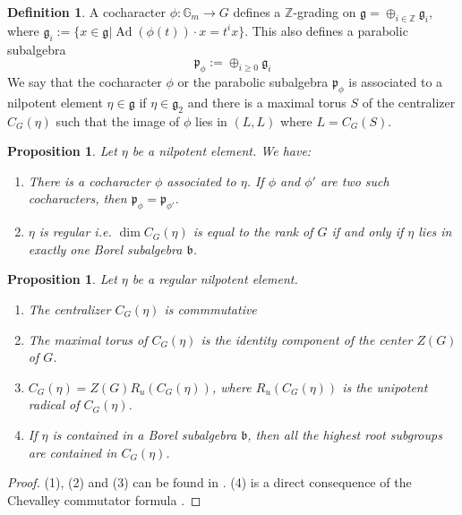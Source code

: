 \documentclass[11pt]{amsart}
\newtheorem{prop}[thm]{Proposition}
\theoremstyle{definition}
\newtheorem{defn}[thm]{Definition}
\theoremstyle{remark}
\DeclareMathOperator{\Ad}{Ad}
\numberwithin{equation}{section}
\begin{document}
\begin{defn} 
    A cocharacter $\phi: \mathbb{G}_m \to G$ defines a $\mathbb{Z}$-grading on $\mathfrak{g}=\oplus_{i \in \mathbb{Z}} \mathfrak{g}_i$, where $\mathfrak{g}_i:= \lbrace x \in \mathfrak{g}| \Ad(\phi(t)) \cdot x = t^i x\rbrace$. This also defines a parabolic subalgebra $$\mathfrak{p}_\phi:= \oplus_{i \geq 0} \mathfrak{g}_i$$
    We say that the cocharacter $\phi$ or the parabolic subalgebra $\mathfrak{p}_\phi$ is associated to a nilpotent element $\eta \in \mathfrak{g}$ if $\eta \in \mathfrak{g}_2$ and there is a maximal torus $S$ of the centralizer $C_G(\eta)$ such that the image of $\phi$ lies in $(L,L)$ where $L=C_G(S)$.
\end{defn}
\begin{prop}
    Let $\eta$ be a nilpotent element. We have:
    \begin{enumerate}
        \item There is a cocharacter $\phi$ associated to $\eta$. If $\phi$ and $\phi'$ are two such cocharacters, then $\mathfrak{p}_\phi=\mathfrak{p}_{\phi'}$.
        \item $\eta$ is regular i.e. $\dim C_G(\eta)$ is equal to the rank of $G$ if and only if $\eta$  lies in exactly one Borel subalgebra $\mathfrak{b}$.
    \end{enumerate}
\end{prop}
\begin{prop}\cite[5.2.4]{McT} \label{regnilpelem}
    Let $\eta$ be a regular nilpotent element. 
    \begin{enumerate}
        \item The centralizer $C_G(\eta)$ is commmutative
        \item The maximal torus of $C_G(\eta)$ is the identity component of the center $Z(G)$ of $G$.
        \item $C_G(\eta)=Z(G)R_u(C_G(\eta))$, where $R_u(C_G(\eta))$ is the unipotent radical of $C_G(\eta)$.
        \item If $\eta$ is contained in a Borel subalgebra $\mathfrak{b}$, then all the highest root subgroups are contained in $C_G(\eta)$. 
    \end{enumerate}
\end{prop}
\begin{proof}
    (1), (2) and (3) can be found in \cite[5.2.4]{McT}. (4) is a direct consequence of the Chevalley commutator formula \cite[Prop. 5.1.14]{Con}.
\end{proof}
\end{document}
